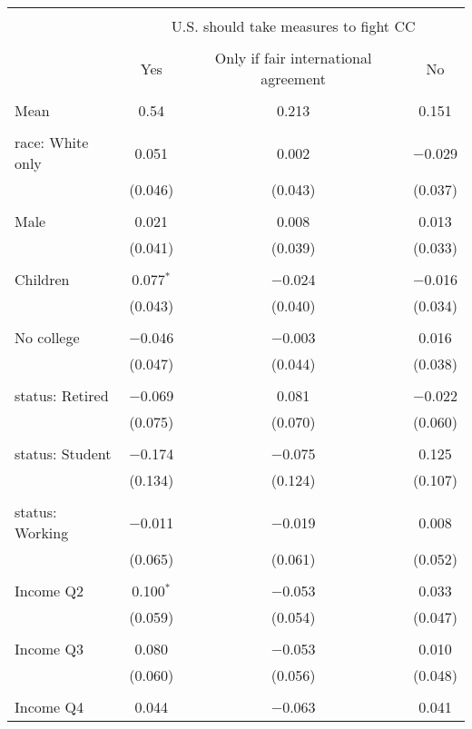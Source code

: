 
\begin{tabular}{@{\extracolsep{5pt}}lccc} 
\\[-1.8ex]\hline 
\hline \\[-1.8ex] 
 & \multicolumn{3}{c}{U.S. should take measures to fight CC} \\ 
\cline{2-4} 
\\[-1.8ex] & Yes & Only if fair international agreement & No \\ 
\hline \\[-1.8ex] 
 Mean & 0.54 & 0.213 & 0.151  \\ \hline \\[-1.8ex] race: White only & 0.051 & 0.002 & $-$0.029 \\ 
  & (0.046) & (0.043) & (0.037) \\ 
  & & & \\ 
 Male & 0.021 & 0.008 & 0.013 \\ 
  & (0.041) & (0.039) & (0.033) \\ 
  & & & \\ 
 Children & 0.077$^{*}$ & $-$0.024 & $-$0.016 \\ 
  & (0.043) & (0.040) & (0.034) \\ 
  & & & \\ 
 No college & $-$0.046 & $-$0.003 & 0.016 \\ 
  & (0.047) & (0.044) & (0.038) \\ 
  & & & \\ 
 status: Retired & $-$0.069 & 0.081 & $-$0.022 \\ 
  & (0.075) & (0.070) & (0.060) \\ 
  & & & \\ 
 status: Student & $-$0.174 & $-$0.075 & 0.125 \\ 
  & (0.134) & (0.124) & (0.107) \\ 
  & & & \\ 
 status: Working & $-$0.011 & $-$0.019 & 0.008 \\ 
  & (0.065) & (0.061) & (0.052) \\ 
  & & & \\ 
 Income Q2 & 0.100$^{*}$ & $-$0.053 & 0.033 \\ 
  & (0.059) & (0.054) & (0.047) \\ 
  & & & \\ 
 Income Q3 & 0.080 & $-$0.053 & 0.010 \\ 
  & (0.060) & (0.056) & (0.048) \\ 
  & & & \\ 
 Income Q4 & 0.044 & $-$0.063 & 0.041 \\ 

\end{tabular}
